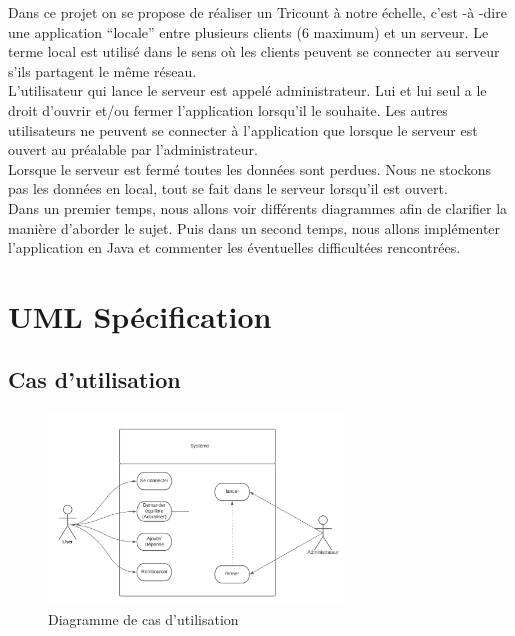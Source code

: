 \documentclass[12,french]{report}
\begin{document}
Dans ce projet on se propose de réaliser un Tricount à notre échelle, c'est -à -dire une application “locale” entre plusieurs clients (6 maximum) et un serveur. Le terme local est utilisé dans le sens où les clients peuvent se connecter au serveur s'ils partagent le même réseau.\\

L’utilisateur qui lance le serveur est appelé administrateur. Lui et lui seul a le droit d’ouvrir et/ou fermer l’application lorsqu’il le souhaite. Les autres utilisateurs ne peuvent se connecter à l’application que lorsque le serveur est ouvert au préalable par l’administrateur. \\

Lorsque le serveur est fermé toutes les données sont perdues. Nous ne stockons pas les données en local, tout se fait dans le serveur lorsqu’il est ouvert.\\

Dans un premier temps, nous allons voir différents diagrammes afin de clarifier la manière d’aborder le sujet. Puis dans un second temps, nous allons implémenter l’application en Java et commenter les éventuelles difficultées rencontrées.\\


\chapter{UML Spécification}

\section{Cas d'utilisation}

\begin{figure}[H]
	\center
	\includegraphics[width=0.7\textwidth]{./Images_pooa/Use-Case}
	\caption{Diagramme de cas d'utilisation}
\end{figure}\vspace{0.2cm}
\end{document}

